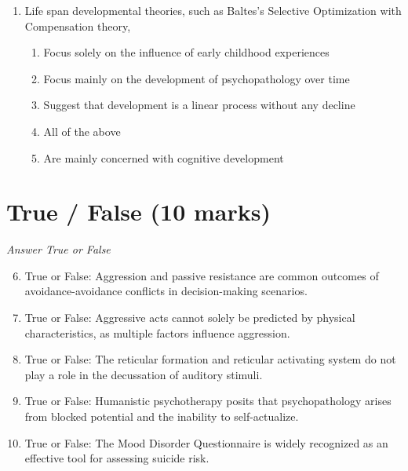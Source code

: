 \documentclass[12pt]{article}
\begin{document}
\begin{enumerate}[label=\arabic*.]
\begin{enumerate}[label=(\alph*)]
    \item positive reinforcement
    \item classical conditioning
    \item intrinsic motivation
    \item observational learning
\end{enumerate}
\item Life span developmental theories, such as Baltes's Selective Optimization with Compensation theory,
\begin{enumerate}[label=(\alph*)]
    \item Focus solely on the influence of early childhood experiences
    \item Focus mainly on the development of psychopathology over time
    \item Suggest that development is a linear process without any decline
    \item All of the above
    \item Are mainly concerned with cognitive development
\end{enumerate}
\end{enumerate}

\section*{True / False (10 marks)}
\textit{Answer True or False}
\begin{enumerate}[label=\arabic*.]
\setcounter{enumi}{5}
\item True or False: Aggression and passive resistance are common outcomes of avoidance-avoidance conflicts in decision-making scenarios.
\item True or False: Aggressive acts cannot solely be predicted by physical characteristics, as multiple factors influence aggression.
\item True or False: The reticular formation and reticular activating system do not play a role in the decussation of auditory stimuli.
\item True or False: Humanistic psychotherapy posits that psychopathology arises from blocked potential and the inability to self-actualize.
\item True or False: The Mood Disorder Questionnaire is widely recognized as an effective tool for assessing suicide risk.
\end{enumerate}
\end{document}
